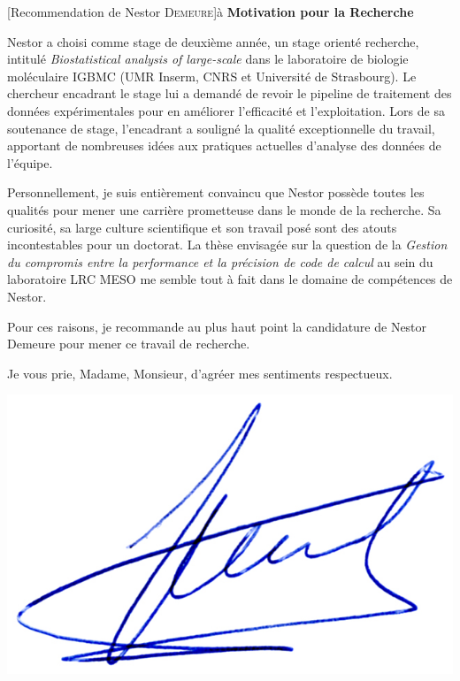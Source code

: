 \documentclass[a4paper,10pt]{article}
\begin{document}
\begin{letter}[Recommendation de Nestor \textsc{Demeure}]{à}
\textbf{Motivation pour la Recherche}

Nestor  a choisi  comme stage  de deuxième  année, un  stage orienté  recherche,
intitulé \emph{Biostatistical  analysis of  large-scale} dans le  laboratoire de
biologie moléculaire IGBMC  (UMR Inserm, CNRS et Université  de Strasbourg).  Le
chercheur encadrant le  stage lui a demandé de revoir  le pipeline de traitement
des    données    expérimentales    pour   en    améliorer    l'efficacité    et
l'exploitation.  Lors de  sa  soutenance  de stage,  l'encadrant  a souligné  la
qualité exceptionnelle du travail, apportant de nombreuses idées aux pratiques
actuelles d'analyse des données de l'équipe.

Personnellement, je  suis entièrement  convaincu que  Nestor possède  toutes les
qualités pour mener une carrière prometteuse  dans le monde de la recherche.  Sa
curiosité, sa  large culture scientifique  et son  travail posé sont  des atouts
incontestables  pour un  doctorat.  La  thèse envisagée  sur la  question de  la
\textit{Gestion du  compromis entre la  performance et  la précision de  code de
  calcul} au sein du laboratoire LRC MESO  me semble tout à fait dans le domaine
de compétences de Nestor.

Pour ces  raisons, je  recommande au  plus haut point  la candidature  de Nestor
Demeure pour mener ce travail de recherche.


Je vous prie, Madame, Monsieur, d'agréer mes sentiments respectueux.

\end{letter}
\begin{flushright}
\includegraphics[width=.2\textwidth]{signgenaud.jpg}
\end{flushright}
\end{document}
